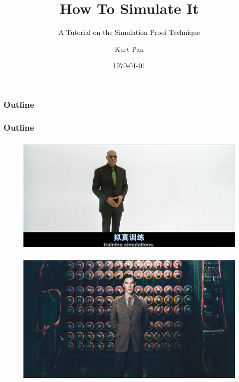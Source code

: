 \documentclass{beamer}
\title{How To Simulate It}
\subtitle{A Tutorial on the Simulation Proof Technique}
\author{Kurt Pan}
\institute[]{Fudan University}
\date{\today}
\begin{document}
    \begin{frame}
        
        \titlepage
    
    \end{frame}


    \begin{frame}
        \frametitle{Outline}
        \tableofcontents[sections={1-3}]
    \end{frame}

    \begin{frame}
        \frametitle{Outline}
        \tableofcontents[sections={4-8}]
    \end{frame}

    \begin{frame}
        \frametitle{}
    
        \begin{figure}
            \includegraphics[scale=0.2]{training-simulation.png}
            
        \end{figure}
    
    \end{frame}

    \begin{frame}
        \frametitle{}
    
        \begin{figure}
            \includegraphics[scale=0.3]{imitation.jpeg}
            
        \end{figure}
    
    \end{frame}
\end{document}
